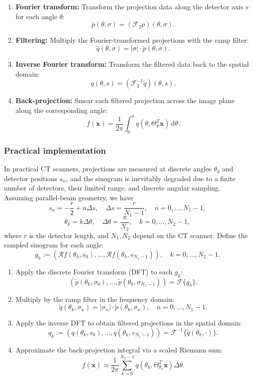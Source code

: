 \documentclass[12pt,a4paper]{article}
\begin{document}
\begin{enumerate}
    \item \textbf{Fourier transform:} Transform the projection data along the detector axis $s$ for each angle $\theta$:
    \[
        \tilde{p}(\theta, \sigma) = (\mathcal{F}_2 p)(\theta, \sigma).
    \]
    \item \textbf{Filtering:} Multiply the Fourier-transformed projections with the ramp filter:
    \[
        \tilde{q}(\theta, \sigma) = |\sigma| \cdot \tilde{p}(\theta, \sigma).
    \]
    \item \textbf{Inverse Fourier transform:} Transform the filtered data back to the spatial domain:
    \[
        q(\theta, s) = (\mathcal{F}_2^{-1} \tilde{q})(\theta, s).
    \]
    \item \textbf{Back-projection:} Smear each filtered projection across the image plane along the corresponding angle:
    \[
        f(\mathbf{x}) = \frac{1}{2\pi} \int_0^\pi q(\theta, \Theta_\theta^T \mathbf{x}) \, \mathrm{d}\theta.
    \]
\end{enumerate}

\subsubsection{Practical implementation}
\label{practical_impl}

In practical CT scanners, projections are measured at discrete angles $\theta_k$ and detector positions $s_n$, and the sinogram is inevitably degraded due to a finite number of detectors, their limited range, and discrete angular sampling. Assuming parallel-beam geometry, we have
\[
    s_n = -\frac{r}{2} + n \Delta s, \quad \Delta s = \frac{r}{N_1-1}, \quad n = 0, \dots, N_1-1,
\]
\[
    \theta_k = k \Delta \theta, \quad \Delta \theta = \frac{\pi}{N_2}, \quad k = 0, \dots, N_2-1,
\]
where $r$ is the detector length, and $N_1, N_2$ depend on the CT scanner.
\newline\newline
Define the sampled sinogram for each angle:
\[
    g_k := (\mathcal{R} f(\theta_k, s_0), \dots, \mathcal{R} f(\theta_k, s_{N_1-1})), \quad k = 0, \dots, N_2-1.
\]

\begin{enumerate}
    \item Apply the discrete Fourier transform (DFT) to each $g_k$:
    \[
        (\tilde{p}(\theta_k, \sigma_0), \dots, \tilde{p}(\theta_k, \sigma_{N_1-1})) = \mathcal{F}\{ g_k \}.
    \]
    \item Multiply by the ramp filter in the frequency domain:
    \[
        \tilde{q}(\theta_k, \sigma_n) = |\sigma_n| \cdot \tilde{p}(\theta_k, \sigma_n), \quad n = 0, \dots, N_1-1.
    \]
    \item Apply the inverse DFT to obtain filtered projections in the spatial domain:
    \[
        q_k := (q(\theta_k, s_0), \dots, q(\theta_k, s_{N_1-1})) = \mathcal{F}^{-1}\{\tilde{q}(\theta_k, \cdot)\}.
    \]
    \item Approximate the back-projection integral via a scaled Riemann sum:
    \[
        f(\mathbf{x}) \approx \frac{1}{2\pi} \sum_{k=0}^{N_2-1} q(\theta_k, \Theta_{\theta_k}^T \mathbf{x}) \Delta \theta.
    \]
\end{enumerate}
\end{document}
